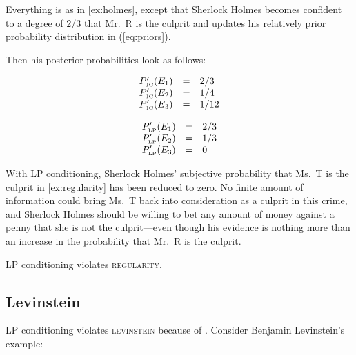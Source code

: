 \documentclass[11pt]{article}
\begin{document}
\begin{quotex}
  \label{ex:regularity} Everything is as
  in {\xample} \ref{ex:holmes}, except that Sherlock Holmes becomes
  confident to a degree of $2/3$ that Mr.\ R is the culprit and
  updates his relatively prior probability distribution in
  (\ref{eq:priors}).
\end{quotex}

Then his posterior probabilities look as follows:

\begin{equation}
  \label{eq:sherlockposteriorjcreg}
  \begin{array}{rcl}
  P'_{\mbox{\tiny JC}}(E_{1})&=&2/3\\
  P'_{\mbox{\tiny JC}}(E_{2})&=&1/4\\
  P'_{\mbox{\tiny JC}}(E_{3})&=&1/12
\end{array}
\end{equation}

\begin{equation}
  \label{eq:sherlockposteriorlpreg}
  \begin{array}{rcl}
  P'_{\mbox{\tiny LP}}(E_{1})&=&2/3\\
  P'_{\mbox{\tiny LP}}(E_{2})&=&1/3\\
  P'_{\mbox{\tiny LP}}(E_{3})&=&0
\end{array}
\end{equation}

With LP conditioning, Sherlock Holmes' subjective probability that
Ms.\ T is the culprit in {\xample} \ref{ex:regularity} has been reduced
to zero. No finite amount of information could bring Ms.\ T back into
consideration as a culprit in this crime, and Sherlock Holmes should
be willing to bet any amount of money against a penny that she is not
the culprit---even though his evidence is nothing more than an
increase in the probability that Mr.\ R is the culprit.

LP conditioning violates \textsc{regularity}.

\subsection{Levinstein}
\label{Levinstein}

LP conditioning violates \textsc{levinstein} because of 
. Consider Benjamin Levinstein's example:
\end{document}
